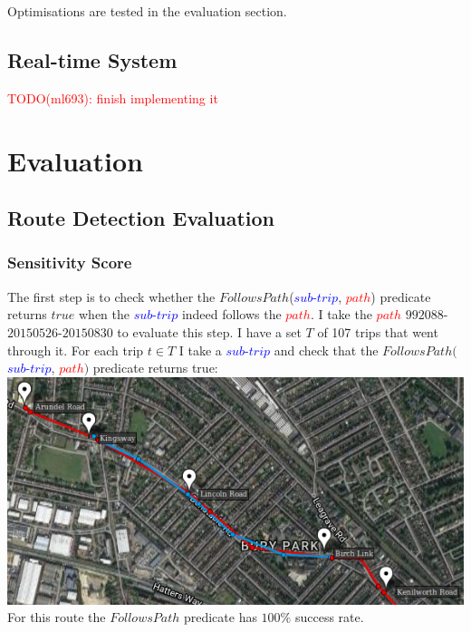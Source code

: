 \documentclass[12pt,a4paper,oneside,openright]{report}
\begin{document}
Optimisations are tested in the evaluation section.



\section{Real-time System}


\textcolor{red}{TODO(ml693): finish implementing it}



\chapter{Evaluation}

\section{Route Detection Evaluation}

\subsection{Sensitivity Score}

The first step is to check whether the 
$FollowsPath$(\textcolor{blue}{$sub$-$trip$}, \textcolor{red}{$path$})
predicate returns $true$ when the \textcolor{blue}{$sub$-$trip$} indeed
follows the \textcolor{red}{$path$}. I take the
\textcolor{red}{$path$} $992088$-$20150526$-$20150830$ to evaluate this step.
I have a set $T$ of 107 trips that went through it. For each trip
$t \in T$ I take a \textcolor{blue}{$sub$-$trip$} and check that the
$FollowsPath($\textcolor{blue}{$sub$-$trip$}, \textcolor{red}{$path$}$)$ 
predicate returns true: \\

\includegraphics[scale = 0.7]{figs/stop1.png} \\

For this route the $FollowsPath$ predicate has $100\%$ success rate.
\end{document}
